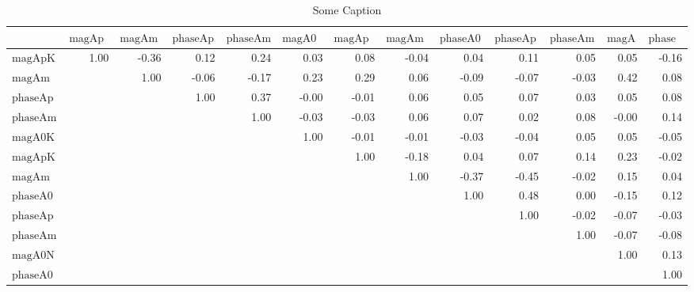 \small
\renewcommand*{\arraystretch}{1.}
\renewcommand{\pm}{\ensuremath{\oldpm} }
\begin{sidewaystable}[h]
\begin{center}
\begin{tabular}{@{}|l|r|r|r|r|r|r|r|r|r|r|r|r|@{}}
\hline
 & $\text{magApKst892}$ & $\text{magAmKst892}$ & $\text{phaseApKst892}$ & $\text{phaseAmKst892}$ & $\text{magA0K21430}$ & $\text{magApK21430}$ & $\text{magAmK21430}$ & $\text{phaseA0K21430}$ & $\text{phaseApK21430}$ & $\text{phaseAmK21430}$ & $\text{magA0NR}$ & $\text{phaseA0NR}$\\ \hline \hline
$\text{magApKst892}$ & 1.00 & -0.36 & 0.12 & 0.24 & 0.03 & 0.08 & -0.04 & 0.04 & 0.11 & 0.05 & 0.05 & -0.16 \\
$\text{magAmKst892}$ &  & 1.00 & -0.06 & -0.17 & 0.23 & 0.29 & 0.06 & -0.09 & -0.07 & -0.03 & 0.42 & 0.08 \\
$\text{phaseApKst892}$ &  &  & 1.00 & 0.37 & -0.00 & -0.01 & 0.06 & 0.05 & 0.07 & 0.03 & 0.05 & 0.08 \\
$\text{phaseAmKst892}$ &  &  &  & 1.00 & -0.03 & -0.03 & 0.06 & 0.07 & 0.02 & 0.08 & -0.00 & 0.14 \\
$\text{magA0K21430}$ &  &  &  &  & 1.00 & -0.01 & -0.01 & -0.03 & -0.04 & 0.05 & 0.05 & -0.05 \\
$\text{magApK21430}$ &  &  &  &  &  & 1.00 & -0.18 & 0.04 & 0.07 & 0.14 & 0.23 & -0.02 \\
$\text{magAmK21430}$ &  &  &  &  &  &  & 1.00 & -0.37 & -0.45 & -0.02 & 0.15 & 0.04 \\
$\text{phaseA0K21430}$ &  &  &  &  &  &  &  & 1.00 & 0.48 & 0.00 & -0.15 & 0.12 \\
$\text{phaseApK21430}$ &  &  &  &  &  &  &  &  & 1.00 & -0.02 & -0.07 & -0.03 \\
$\text{phaseAmK21430}$ &  &  &  &  &  &  &  &  &  & 1.00 & -0.07 & -0.08 \\
$\text{magA0NR}$ &  &  &  &  &  &  &  &  &  &  & 1.00 & 0.13 \\
$\text{phaseA0NR}$ &  &  &  &  &  &  &  &  &  &  &  & 1.00 \\
\hline
\end{tabular}
\caption{Some Caption}
\label{thisTable}
\end{center}
\end{sidewaystable}
\renewcommand{\pm}{\oldpm}
\restoregeometry

